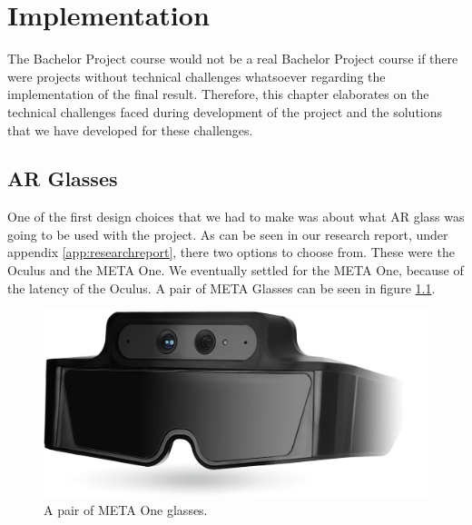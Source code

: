 \chapter{Implementation} \label{cha:implementation}
    The Bachelor Project course would not be a real Bachelor Project course if 
    there were projects without technical challenges whatsoever regarding the 
    implementation of the final result. Therefore, this chapter elaborates
    on the technical challenges faced during development of the project and
    the solutions that we have developed for these challenges.
    
    \section{AR Glasses} \label{sec:arglasses}
        One of the first design choices that we had to make was about what
        AR glass was going to be used with the project. As can be seen in
        our research report, under appendix \ref{app:researchreport},
        there two options to choose from. These were the Oculus and
        the META One. We eventually settled for the META One, because
        of the latency of the Oculus. A pair of META Glasses can be seen in
        figure \ref{fig:metaone}.
        
        \begin{figure}[!ht]
            \centering
            \includegraphics[width=\textwidth]{MetaOneGlasses}
            \caption{A pair of META One glasses.}
            \label{fig:metaone}
        \end{figure}
        
